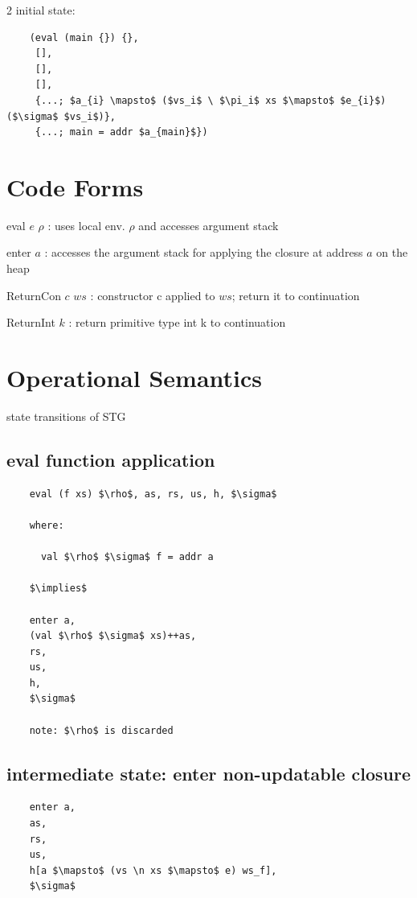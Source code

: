 \documentclass[8pt]{extarticle}
\begin{document}
\begin{multicols*}{2}
  initial state:

  \begin{lstlisting}
    (eval (main {}) {},
     [],
     [],
     [],
     {...; $a_{i} \mapsto$ ($vs_i$ \ $\pi_i$ xs $\mapsto$ $e_{i}$) ($\sigma$ $vs_i$)},
     {...; main = addr $a_{main}$})
  \end{lstlisting}
   
  \section{Code Forms}

  eval $e$ $\rho$ : uses local env. $\rho$ and accesses argument stack

  enter $a$ : accesses the argument stack for applying the closure at address $a$ on the heap

  ReturnCon $c$ $ws$ : constructor c applied to $ws$; return it to continuation

  ReturnInt $k$ : return primitive type int k to continuation

  \vfill\null
  \columnbreak

  \section{Operational Semantics}
  state transitions of STG

  \subsection{eval function application}

  \begin{lstlisting}
    eval (f xs) $\rho$, as, rs, us, h, $\sigma$
    
    where:
    
      val $\rho$ $\sigma$ f = addr a

    $\implies$

    enter a,
    (val $\rho$ $\sigma$ xs)++as,
    rs,
    us,
    h,
    $\sigma$

    note: $\rho$ is discarded
  \end{lstlisting}

  \subsection{intermediate state: enter non-updatable closure}

  \begin{lstlisting}
    enter a,
    as,
    rs,
    us,
    h[a $\mapsto$ (vs \n xs $\mapsto$ e) ws_f],
    $\sigma$


\end{lstlisting}
\end{multicols*}
\end{document}
